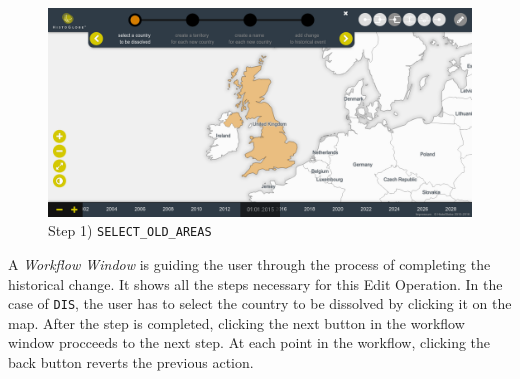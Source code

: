 \vspace{1em}
\begin{minipage}[t]{0.47\textwidth}

  \begin{figure}[H]
    \centering
    \includegraphics[width=1.0\textwidth]{graphics/development/final_interface/3_select_old_areas.png}
    \caption{Step 1) \texttt{SELECT\_OLD\_AREAS}}
    \label{fig:final_3_select_old_areas}
  \end{figure}

  A \emph{Workflow Window} is guiding the user through the process of completing the historical change. It shows all the steps necessary for this Edit Operation. In the case of \texttt{DIS}, the user has to select the country to be dissolved by clicking it on the map. After the step is completed, clicking the next button in the workflow window procceeds to the next step. At each point in the workflow, clicking the back button reverts the previous action.

\end{minipage}    %
\hspace{1.5em}    %
